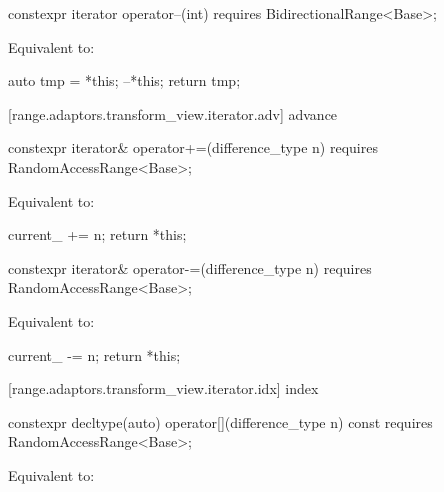 \begin{itemdecl}
constexpr iterator operator--(int) requires BidirectionalRange<Base>;
\end{itemdecl}

\begin{itemdescr}
\pnum
\effects Equivalent to:
\begin{codeblock}
auto tmp = *this;
--*this;
return tmp;
\end{codeblock}
\end{itemdescr}

[range.adaptors.transform_view.iterator.adv]{ advance}

\begin{itemdecl}
constexpr iterator& operator+=(difference_type n)
  requires RandomAccessRange<Base>;
\end{itemdecl}

\begin{itemdescr}
\pnum
\effects Equivalent to:
\begin{codeblock}
current_ += n;
return *this;
\end{codeblock}
\end{itemdescr}

%
\begin{itemdecl}
constexpr iterator& operator-=(difference_type n)
  requires RandomAccessRange<Base>;
\end{itemdecl}

\begin{itemdescr}
\pnum
\effects Equivalent to:
\begin{codeblock}
current_ -= n;
return *this;
\end{codeblock}
\end{itemdescr}

[range.adaptors.transform_view.iterator.idx]{ index}

\begin{itemdecl}
constexpr decltype(auto) operator[](difference_type n) const
  requires RandomAccessRange<Base>;
\end{itemdecl}

\begin{itemdescr}
\pnum
\effects Equivalent to: 
\end{itemdescr}

